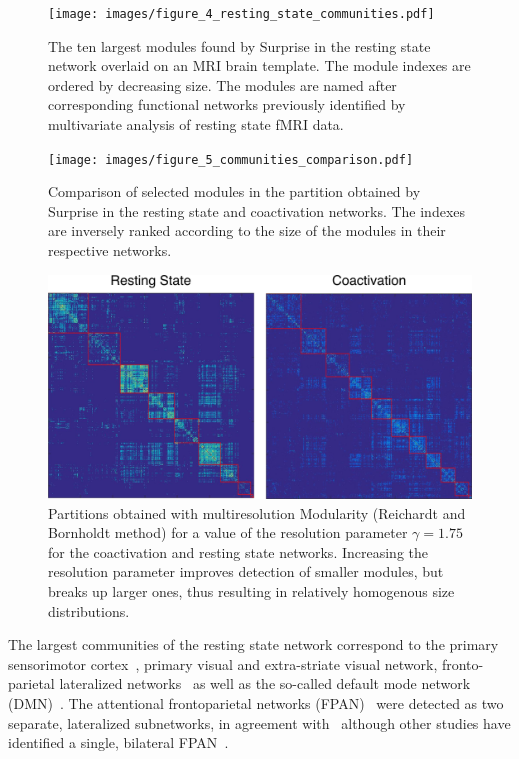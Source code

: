 \begin{figure}[htb!]
\centering
\texttt{[image: images/figure\_4\_resting\_state\_communities.pdf]}
\caption{The ten largest modules found by Surprise in the resting state network overlaid on an MRI brain template. The module indexes are ordered by decreasing size. The modules are named after corresponding functional networks previously identified by multivariate analysis of resting state fMRI data.}
\label{fig:figure_4_resting_state_communities}
\end{figure}

\begin{figure}[htb!]
\centering
\texttt{[image: images/figure\_5\_communities\_comparison.pdf]}
\caption{Comparison of selected modules in the partition obtained by Surprise in the resting state and coactivation networks. The indexes are inversely ranked according to the size of the modules in their respective networks.}
\label{fig:figure_5_communities_comparison}
\end{figure}

\begin{figure}[htb!]
\centering
\includegraphics[width=1\linewidth]{images/coact_rs_gamma_1_75.png}
\caption{Partitions obtained with multiresolution Modularity (Reichardt and Bornholdt method) for a value of the resolution parameter $\gamma=1.75$ for the coactivation and resting state networks. Increasing the resolution parameter improves detection of smaller modules, but breaks up larger ones, thus resulting in relatively homogenous size distributions.}
\label{fig:figure_11_gamma_1_75_rs_coact}
\end{figure}



The largest communities of the resting state network correspond to the primary sensorimotor cortex~\cite{biswal1995}, primary visual and extra-striate visual network, fronto-parietal lateralized networks~\cite{smith2009} as well as the so-called default mode network (DMN)~\cite{raichle2001,fransson2006}.
The attentional frontoparietal networks (FPAN)~\cite{beckmann2005} were detected as two separate, lateralized subnetworks, in agreement with~\cite{deluca2006} although other studies have identified a single, bilateral FPAN~\cite{markett2014}.

